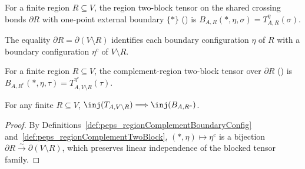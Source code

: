 \begin{definition}%
    \label{def:peps_regionTwoBlock}
    \leanok
    For a finite region $R\subseteq V$, the region two-block tensor on the
    shared crossing bonds $\partial R$ with one-point external boundary $\{*\}$
    (\cite[Section~3]{Molnar2018NormalPEPS}) is
    $B_{A,R}(*,\eta,\sigma)=T_{A,R}^{\eta}(\sigma)$.
\end{definition}

\begin{definition}%
    \label{def:peps_regionComplementBoundaryConfig}
    \leanok
    The equality $\partial R=\partial(V\setminus R)$ identifies each boundary
    configuration $\eta$ of $R$ with a boundary configuration $\eta^c$ of
    $V\setminus R$.
\end{definition}

\begin{definition}%
    \label{def:peps_regionComplementTwoBlock}
    \leanok
    For a finite region $R\subseteq V$, the complement-region two-block tensor
    over $\partial R$ (\cite[Section~3]{Molnar2018NormalPEPS}) is
    $B_{A,R^c}(*,\eta,\tau)=T_{A,V\setminus R}^{\eta^c}(\tau)$.
\end{definition}

\begin{lemma}%
    \label{thm:peps_isTwoBlockInjective_regionComplementTwoBlock}
    \leanok
    For any finite $R\subseteq V$,
    $\inj(T_{A,V\setminus R})\Longrightarrow\inj(B_{A,R^c})$.
\end{lemma}
\begin{proof}\leanok
    By Definitions~\ref{def:peps_regionComplementBoundaryConfig}
    and~\ref{def:peps_regionComplementTwoBlock}, $(*,\eta)\mapsto\eta^c$ is a
    bijection $\partial R\xrightarrow{\sim}\partial(V\setminus R)$, which
    preserves linear independence of the blocked tensor family.
\end{proof}

